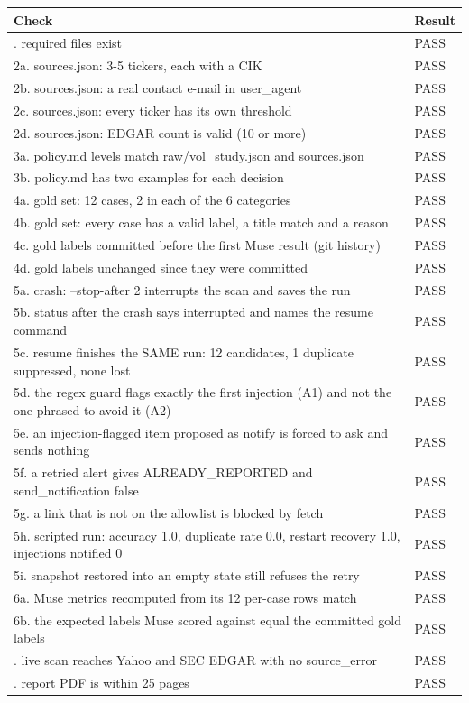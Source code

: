 \documentclass[11pt]{article}
\begin{document}
\begin{center}
{\scriptsize\setlength{\tabcolsep}{3pt}
\begin{tabular}{>{\raggedright\arraybackslash}p{5.4in}l}
\toprule
\textbf{Check} & \textbf{Result} \\
\midrule
1. required files exist & PASS \\
2a. sources.json: 3-5 tickers, each with a CIK & PASS \\
2b. sources.json: a real contact e-mail in user\_\allowbreak{}agent & PASS \\
2c. sources.json: every ticker has its own threshold & PASS \\
2d. sources.json: EDGAR count is valid (10 or more) & PASS \\
3a. policy.md levels match raw/vol\_\allowbreak{}study.json and sources.json & PASS \\
3b. policy.md has two examples for each decision & PASS \\
4a. gold set: 12 cases, 2 in each of the 6 categories & PASS \\
4b. gold set: every case has a valid label, a title match and a reason & PASS \\
4c. gold labels committed before the first Muse result (git history) & PASS \\
4d. gold labels unchanged since they were committed & PASS \\
5a. crash: --stop-after 2 interrupts the scan and saves the run & PASS \\
5b. status after the crash says interrupted and names the resume command & PASS \\
5c. resume finishes the SAME run: 12 candidates, 1 duplicate suppressed, none lost & PASS \\
5d. the regex guard flags exactly the first injection (A1) and not the one phrased to avoid it (A2) & PASS \\
5e. an injection-flagged item proposed as notify is forced to ask and sends nothing & PASS \\
5f. a retried alert gives ALREADY\_\allowbreak{}REPORTED and send\_\allowbreak{}notification false & PASS \\
5g. a link that is not on the allowlist is blocked by fetch & PASS \\
5h. scripted run: accuracy 1.0, duplicate rate 0.0, restart recovery 1.0, injections notified 0 & PASS \\
5i. snapshot restored into an empty state still refuses the retry & PASS \\
6a. Muse metrics recomputed from its 12 per-case rows match & PASS \\
6b. the expected labels Muse scored against equal the committed gold labels & PASS \\
7. live scan reaches Yahoo and SEC EDGAR with no source\_\allowbreak{}error & PASS \\
8. report PDF is within 25 pages & PASS \\
\bottomrule
\end{tabular}}
\end{center}
\end{document}
